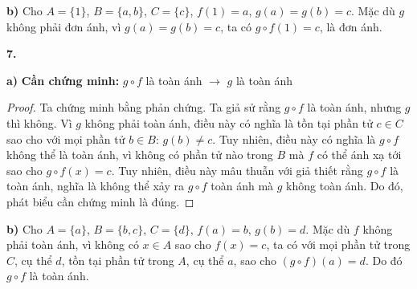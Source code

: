 \documentclass[12pt,a4paper]{article}
\theoremstyle{definition}
\begin{document}
\textbf{b)} Cho $A = \{1\}$, $B = \{a, b\}$, $C = \{c\}$, $f(1) = a$, $g(a) = g(b) = c$. Mặc dù $g$ không phải đơn ánh, vì $g(a) = g(b) = c$, ta có $g \circ f(1) = c$, là đơn ánh.

\bigskip
\textbf{7.}

\textbf{a)} \textbf{Cần chứng minh:} $g \circ f$ là toàn ánh $\to$ $g$ là toàn ánh

\begin{proof}
Ta chứng minh bằng phản chứng. Ta giả sử rằng $g \circ f$ là toàn ánh, nhưng $g$ thì không. Vì $g$ không phải toàn ánh, điều này có nghĩa là tồn tại phần tử $c \in C$ sao cho với mọi phần tử $b \in B$: $g(b) \neq c$. Tuy nhiên, điều này có nghĩa là $g \circ f$ không thể là toàn ánh, vì không có phần tử nào trong $B$ mà $f$ có thể ánh xạ tới sao cho $g \circ f(x) = c$. Tuy nhiên, điều này mâu thuẫn với giả thiết rằng $g \circ f$ là toàn ánh, nghĩa là không thể xảy ra $g \circ f$ toàn ánh mà $g$ không toàn ánh. Do đó, phát biểu cần chứng minh là đúng.
\end{proof}

\textbf{b)} Cho $A = \{a\}$, $B = \{b, c\}$, $C = \{d\}$, $f(a) = b$, $g(b) = d$. Mặc dù $f$ không phải toàn ánh, vì không có $x \in A$ sao cho $f(x) = c$, ta có với mọi phần tử trong $C$, cụ thể $d$, tồn tại phần tử trong $A$, cụ thể $a$, sao cho $(g \circ f)(a) = d$. Do đó $g \circ f$ là toàn ánh.
\end{document}
